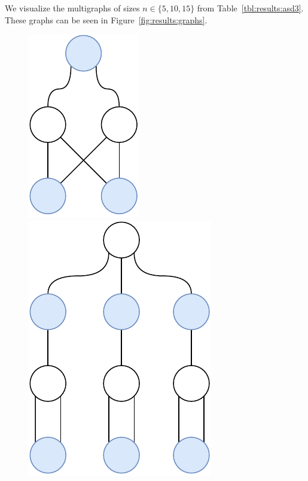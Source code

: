 We visualize the multigraphs of sizes $n \in \{5,10,15\}$ from Table~\ref{tbl:results:asd3}.
These graphs can be seen in Figure~\ref{fig:results:graphs}.

\begin{figure}[H]
    {
      \centering
      \includegraphics[scale=0.4]{diagrams/results_multigraph_n5_1.pdf}
    }
    \hfill
       {
      \centering
      \includegraphics[scale=0.4]{diagrams/results_multigraph_n10_1.pdf}
    }
    \hfill
       {
      \centering
}
\end{figure}
